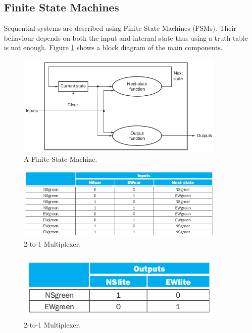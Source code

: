 \documentclass[a4paper, 11pt,oneside]{article}
\begin{document}
\subsection{Finite State Machines}
Sequential systems are described using Finite State Machines (FSMs). Their 
behaviour depends on both the input and internal state thus using a truth table
is not enough. Figure \ref{fig:fsm0} shows a block diagram of the main 
components. 



\begin{figure}[H]
	\begin{center}
	\includegraphics[width=4in]{fsm0.png}
	\caption{A Finite State Machine.}
	\label{fig:fsm0} 
	\end{center}
\end{figure}

\begin{figure}[H]
	\begin{center}
	\includegraphics[width=4in]{fsm1.png}
	\caption{2-to-1 Multiplexer.}
	\label{fig:mux} 
	\end{center}
\end{figure}

\begin{figure}[H]
	\begin{center}
	\includegraphics[width=4in]{fsm2.png}
	\caption{2-to-1 Multiplexer.}
	\label{fig:mux} 
	\end{center}
\end{figure}
\end{document}
